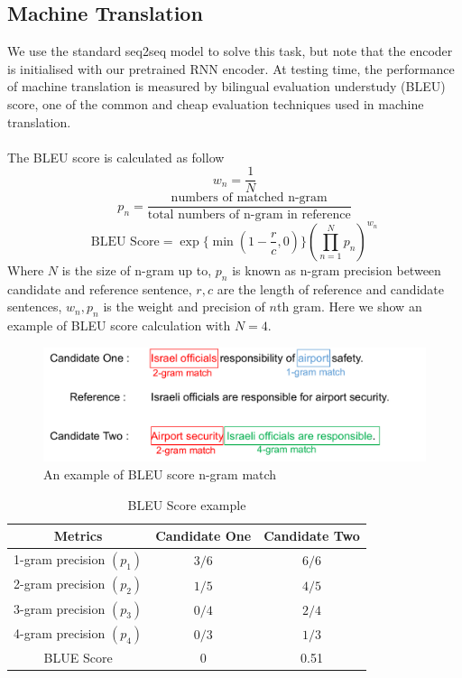\subsection{Machine Translation}
We use the standard seq2seq model to solve this task, but note that the encoder is initialised with our pretrained RNN encoder. 
At testing time, the performance of machine translation is measured by bilingual evaluation understudy (BLEU) score\cite{papineni2002bleu}, one of the common and cheap evaluation techniques used in machine translation.\\\\
The BLEU score is calculated as follow 
\[ w_{n} = \frac{1}{N}\]
\[p_{n} = \frac{\text{numbers of matched n-gram}}{\text{total numbers of n-gram in reference}}\]
\begin{equation}
\text{BLEU Score} = \exp\{\min(1-\frac{r}{c}, 0)\} (\prod_{n=1}^{N}p_{n})^{w_{n}}
\end{equation}
Where $N$ is the size of n-gram up to, $p_{n}$ is known as n-gram precision between candidate and reference sentence, $r,c$ are the length of reference and candidate sentences, $w_{n}, p_{n}$ is the weight and precision of $n$th gram. Here we show an example of BLEU score calculation with $N = 4$.
\begin{figure}[h]
	\centering
	\includegraphics[width=0.7\linewidth]{BLEU}
	\caption{An example of BLEU score n-gram match}
	\label{fig:BLEU}
\end{figure}
\begin{table}[H]
	\begin{center}
		\begin{tabular}{|c|c|c|}
			\hline
			Metrics & Candidate One & Candidate Two \\
			\hline
			1-gram precision $(p_{1})$ & $3/6$ & $6/6$ \\
			\hline
			2-gram precision $(p_{2})$ & $1/5$ & $4/5$ \\
			\hline
			3-gram precision $(p_{3})$& $0/4$ & $2/4$ \\
			\hline
			4-gram precision $(p_{4})$& $0/3$ & $1/3$ \\
			\hline
			BLUE Score &  0 & 0.51 \\
			\hline
		\end{tabular}
	\end{center}
	\caption{BLEU Score example}
	\label{BLUE table}
\end{table}


